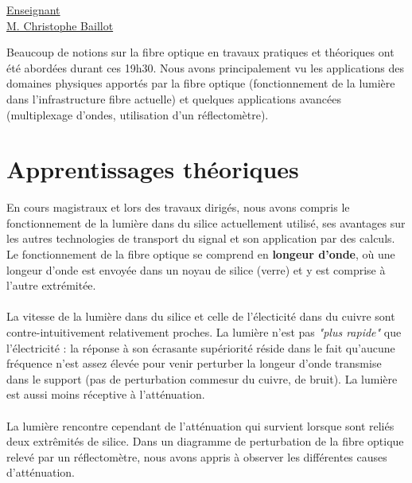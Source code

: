 \renewcommand{\figurename}{}

\vspace*{0.2cm}%
      \large
      \href{}{\color{black}Enseignant\\M. Christophe Baillot}\\%
      \normalsize
\vspace*{0.5cm}%

Beaucoup de notions sur la fibre optique en travaux pratiques et théoriques ont été abordées durant ces 19h30. Nous avons principalement vu les applications des domaines physiques apportés par la fibre optique (fonctionnement de la lumière dans l'infrastructure fibre actuelle) et quelques applications avancées (multiplexage d'ondes, utilisation d'un réflectomètre).

\section{Apprentissages théoriques}

En cours magistraux et lors des travaux dirigés, nous avons compris le fonctionnement de la lumière dans du silice actuellement utilisé, ses avantages sur les autres technologies de transport du signal et son application par des calculs. Le fonctionnement de la fibre optique se comprend en \textbf{longeur d'onde}, où une longeur d'onde est envoyée dans un noyau de silice (verre) et y est comprise à l'autre extrémitée.
\\ \\
La vitesse de la lumière dans du silice et celle de l'électicité dans du cuivre sont contre-intuitivement relativement proches. La lumière n'est pas \textit{"plus rapide"} que l'électricité : la réponse à son écrasante supériorité réside dans le fait qu'aucune fréquence n'est assez élevée pour venir perturber la longeur d'onde transmise dans le support (pas de perturbation commesur du cuivre, de bruit). La lumière est aussi moins réceptive à l'atténuation.
\\ \\
La lumière rencontre cependant de l'atténuation qui survient lorsque sont reliés deux extrêmités de silice. Dans un diagramme de perturbation de la fibre optique relevé par un réflectomètre, nous avons appris à observer les différentes causes d'atténuation.

